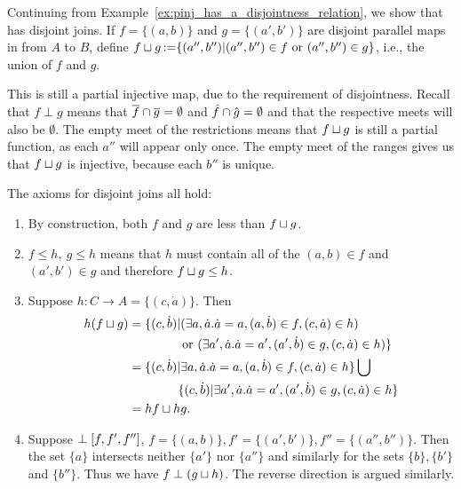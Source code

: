 \begin{example}\label{ex:pinj_has_a_disjoint_join}
  Continuing from Example~\ref{ex:pinj_has_a_disjointness_relation}, we show that \pinj has disjoint
  joins. If $f = \{(a,b)\}$ and $g=\{(a',b')\}$ are disjoint parallel maps in \pinj from $A$ to $B$,
  define $f\sqcup g \operatorname*{:\!=} \{(a'',b'') | (a'',b'') \in f\text{ or }(a'',b'') \in g\}$, i.e., the
  union of $f$ and $g$.

  This is still a partial injective map, due to the requirement of disjointness. Recall that $f\perp
  g$ means that $\overline{f}\cap \overline{g} = \emptyset$ and $\hat{f}\cap\hat{g} =
  \emptyset$ and that the respective meets will also be $\emptyset$. The empty meet of the
  restrictions means that $f\sqcup g$ is still a partial function,  as each $a''$ will appear only
  once. The empty meet of the ranges gives us that $f\sqcup g$ is injective, because each $b''$ is
  unique.

  The axioms for disjoint joins all hold:
  \begin{enumerate}
    \item[\axiom{DJ}{1}] By construction, both $f$ and $g$ are less than $f\sqcup g$.
    \item[\axiom{DJ}{2}] $f \le h,\ g \le h$ means that $h$ must contain all of the $(a,b)\in f$ and
      $(a',b') \in g$ and therefore $f\sqcup g \le h$.
    \item[\axiom{DJ}{3}] Suppose $h:C\to A = \{(c,\dot{a})\}$. Then
      \begin{align*}
        h(f \sqcup g) &= \{(c,\dot{b}) |(\exists a,\dot{a}.\dot{a} = a, (a,\dot{b}) \in f,
        (c,\dot{a}) \in h) \\
        & \qquad\qquad \text{ or }(\exists a',\dot{a}.\dot{a} = a', (a',\dot{b}) \in g, (c,\dot{a}) \in h)\}\\
        & = \{(c,\dot{b}) |\exists a, \dot{a}.\dot{a} = a, (a,\dot{b}) \in f, (c,\dot{a}) \in h\} \bigcup\\
        & \qquad\qquad\{(c,\dot{b}) | \exists a',\dot{a}.\dot{a} = a', (a',\dot{b}) \in g, (c,\dot{a}) \in h\}\\
        &= h f \sqcup h g.
      \end{align*}
    \item[\axiom{DJ}{4}] Suppose $\perp [f, f', f'']$, $f=\{(a,b)\}, f'=\{(a',b')\},
      f''=\{(a'',b'')\}$. Then the set $\{a\}$  intersects neither $\{a'\}$ nor $\{a''\}$ and
      similarly for the sets $\{b\}, \{b'\}$ and $\{b''\}$. Thus we have $f \perp (g\sqcup h)$. The
      reverse direction is argued similarly.
  \end{enumerate}
\end{example}


